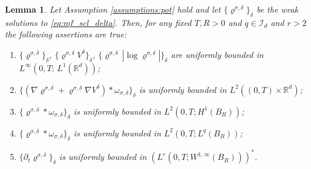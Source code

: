 \documentclass[reqno, 11pt]{amsart}
\numberwithin{equation}{section}
\newtheorem{lem}[thm]{Lemma}
\theoremstyle{definition}
\begin{document}
\begin{lem}
    \label{lem:unif_bnds_approx}
    Let Assumption \ref{assumptions:pot} hold and let $\{\varrho^{\sigma,\delta}\}_\delta$ be the weak solutions to \eqref{eq:mf_scl_delta}. Then, for any fixed $T,R>0$ and $q\in\mathcal{I}_d$ and $r>2$ the following assertions are true:
    \begin{enumerate}[label=(T\arabic*)]
        \item\label{bnd:mf_scl_del_kl} $\{\varrho^{\sigma,\delta}\}_\delta$, $\{\varrho^{\sigma,\delta} V^\delta\}_\delta$, $\{\varrho^{\sigma,\delta}\,|\log\varrho^{\sigma,\delta}|\}_\delta$ are uniformly bounded in $L^\infty(0,T;\,L^1(\mathbb{R}^{d}))$;
        \item\label{bnd:mf_scl_del_dis} $\{(\nabla\varrho^{\sigma,\delta}+\varrho^{\sigma,\delta}\nabla V^\delta)\ast \omega_{\sigma,\delta}\}_\delta$ is uniformly bounded in $L^2((0,T)\times\mathbb{R}^{d})$;
        \item\label{bnd:mf_scl_del_nabla} $\{\varrho^{\sigma,\delta}\ast \omega_{\sigma,\delta}\}_\delta$ is uniformly bounded in $L^2(0,T;H^1(B_R))$;
        \item\label{bnd:mf_scl_del_lp} $\{\varrho^{\sigma,\delta}\ast \omega_{\sigma,\delta}\}_\delta$ is uniformly bounded in $L^2(0,T;L^q(B_R))$;
        \item\label{bnd:mf_scl_del_dt} $\{\partial_t \varrho^{\sigma,\delta}\}_\delta$ is uniformly bounded in $(L^r(0,T; W^{1,\infty}(B_R)))^\ast$.
    \end{enumerate}
\end{lem}
\end{document}

